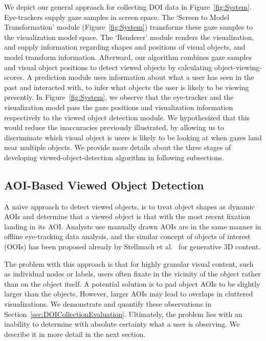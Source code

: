 We depict our general approach for collecting DOI data in Figure~\ref{fig:System}. Eye-trackers supply gaze samples in screen space. The `Screen to Model Transformation' module (Figure~\ref{fig:System}) transforms these gaze samples to the visualization model space. The `Renderer' module renders the visualization, and supply information regarding shapes and positions of visual objects, and model transform information. Afterward, our algorithm combines gaze samples and visual object positions to detect viewed objects by calculating object-viewing-scores. A prediction module uses information about what a user has seen in the past and interacted with, to infer what objects the user is likely to be viewing presently. In Figure~\ref{fig:System}, we observe that the eye-tracker and the visualization model pass the gaze positions and visualization information respectively to the viewed object detection module. We hypothesized that this would reduce the inaccuracies previously illustrated, by allowing us to discriminate which visual object is users is likely to be looking at when gazes land near multiple objects.
We provide more details about the three stages of developing viewed-object-detection algorithm in following subsections. 

\subsection{AOI-Based Viewed Object Detection}
\label{sec:AOIBasedViewedObjectDetection}

A na\"{\i}ve approach to detect viewed objects, is to treat object shapes as dynamic AOIs and determine that a viewed object is that with the most recent fixation landing in its AOI. Analysts use manually drawn AOIs are in the same manner in offline eye-tracking data analysis, and the similar concept of objects of interest (OOIs) has been proposed already by Stellmach et al.~\cite{Ste10} for generative 3D content.

The problem with this approach is that for highly granular visual content, such as individual nodes or labels, users often fixate in the vicinity of the object rather than on the object itself. A potential solution is to pad object AOIs to be slightly larger than the objects. However, larger AOIs may lead to overlaps in cluttered visualizations. We demonstrate and quantify these observations in Section~\ref{sec:DOICollectionEvaluation}. Ultimately, the problem lies with an inability to determine with absolute certainty what a user is observing. We describe it in more detail in the next section.

